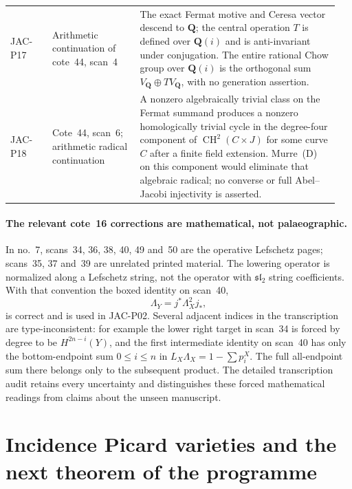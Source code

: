 \documentclass[11pt,a4paper]{article}
\begin{document}
\begin{longtable}{@{}p{0.12\linewidth}p{0.25\linewidth}p{0.58\linewidth}@{}}
JAC-P17 & Arithmetic continuation of cote~44, scan~4 &
The exact Fermat motive and Ceresa vector descend to $\mathbf Q$;
the central operation $T$ is defined over $\mathbf Q(i)$ and is
anti-invariant under conjugation. The entire rational Chow group
over $\mathbf Q(i)$ is the orthogonal sum $V_{\mathbf Q}\oplus
T V_{\mathbf Q}$, with no generation assertion.\\
JAC-P18 & Cote~44, scan~6; arithmetic radical continuation &
A nonzero algebraically trivial class on the Fermat summand
produces a nonzero homologically trivial cycle in the degree-four
component of $\operatorname{CH}^2(C\times J)$ for some curve $C$
after a finite field extension. Murre~(D) on this component would
eliminate that algebraic radical; no converse or full
Abel--Jacobi injectivity is asserted.\\
\bottomrule
\end{longtable}
\endgroup

\paragraph{The relevant cote~16 corrections are mathematical, not palaeographic.}
In no.~7, scans~34, 36, 38, 40, 49 and~50 are the operative
Lefschetz pages; scans~35, 37 and~39 are unrelated printed
material. The lowering operator is normalized along a Lefschetz
string, not the operator with $\mathfrak{sl}_2$ string
coefficients. With that convention the boxed identity on scan~40,
\[
             \Lambda_Y=j^*\Lambda_X^2j_*,
\]
is correct and is used in JAC-P02. Several adjacent indices in
the transcription are type-inconsistent: for example the lower
right target in scan~34 is forced by degree to be
$H^{2n-i}(Y)$, and the first intermediate identity on scan~40
has only the bottom-endpoint sum $0\le i\le n$ in
$L_X\Lambda_X=1-\sum p_i^X$. The full all-endpoint sum there
belongs only to the subsequent product. The detailed
transcription audit retains every uncertainty and distinguishes
these forced mathematical readings from claims about the
unseen manuscript.


\section{Incidence Picard varieties and the next theorem of the programme}
\end{document}
